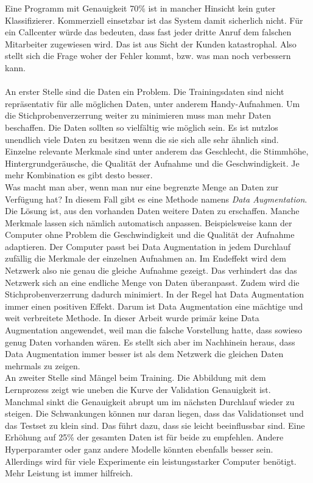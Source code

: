 Eine Programm mit Genauigkeit 70\% ist in mancher Hinsicht kein guter Klassifizierer. Kommerziell einsetzbar ist das System damit sicherlich nicht. Für ein Callcenter würde das bedeuten, dass fast jeder dritte Anruf dem falschen Mitarbeiter zugewiesen wird. Das ist aus Sicht der Kunden katastrophal. Also stellt sich die Frage woher der Fehler kommt, bzw. was man noch verbessern kann.
\\ \\
An erster Stelle sind die Daten ein Problem. Die Trainingsdaten sind nicht repräsentativ für alle möglichen Daten, unter anderem Handy-Aufnahmen. Um die Stichprobenverzerrung weiter zu minimieren muss man mehr Daten beschaffen. Die Daten sollten so vielfältig wie möglich sein. Es ist nutzlos unendlich viele Daten zu besitzen wenn die sie sich alle sehr ähnlich sind. Einzelne relevante Merkmale sind unter anderem das Geschlecht, die Stimmhöhe, Hintergrundgeräusche, die Qualität der Aufnahme und die Geschwindigkeit. Je mehr Kombination es gibt desto besser. 
\\
Was macht man aber, wenn man nur eine begrenzte Menge an Daten zur Verfügung hat? In diesem Fall gibt es eine Methode namens \textit{Data Augmentation}. Die Lösung ist, aus den vorhanden Daten weitere Daten zu erschaffen. Manche Merkmale lassen sich nämlich automatisch anpassen. Beispielsweise kann der Computer ohne Problem die Geschwindigkeit und die Qualität der Aufnahme adaptieren. Der Computer passt bei Data Augmentation in jedem Durchlauf zufällig die Merkmale der einzelnen Aufnahmen an. Im Endeffekt wird dem Netzwerk also nie genau die gleiche Aufnahme gezeigt. Das verhindert das das Netzwerk sich an eine endliche Menge von Daten überanpasst. Zudem wird die Stichprobenverzerrung dadurch minimiert. In der Regel hat Data Augmentation immer einen positiven Effekt. Darum ist Data Augmentation  eine mächtige und weit verbreitete Methode.  In dieser Arbeit wurde primär keine Data Augmentation angewendet, weil man die falsche Vorstellung hatte, dass sowieso genug Daten vorhanden wären. Es stellt sich aber im Nachhinein heraus, dass Data Augmentation immer besser ist als dem Netzwerk die gleichen Daten mehrmals zu zeigen. 
\\
An zweiter Stelle sind Mängel beim Training. Die Abbildung mit dem Lernprozess zeigt wie uneben die Kurve der Validation Genauigkeit ist. Manchmal sinkt die Genauigkeit abrupt um im nächsten Durchlauf wieder zu steigen. Die Schwankungen können nur daran liegen, dass das Validationset und das Testset zu klein sind. Das führt dazu, dass sie leicht beeinflussbar sind. Eine Erhöhung auf 25\% der gesamten Daten ist für beide zu empfehlen. Andere Hyperparamter oder ganz andere Modelle könnten ebenfalls besser sein. Allerdings wird für viele Experimente ein leistungsstarker Computer benötigt. Mehr Leistung ist immer hilfreich.
